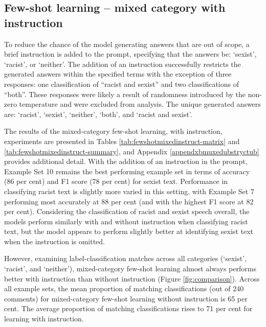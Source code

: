 \documentclass[12pt,]{article}
\begin{document}
\hypertarget{few-shot-learning-mixed-category-with-instruction}{%
\subsection{Few-shot learning -- mixed category with instruction}\label{few-shot-learning-mixed-category-with-instruction}}

To reduce the chance of the model generating answers that are out of scope, a brief instruction is added to the prompt, specifying that the answers be: `sexist', `racist', or `neither'. The addition of an instruction successfully restricts the generated answers within the specified terms with the exception of three responses: one classification of ``racist and sexist'' and two classifications of ``both''. These responses were likely a result of randomness introduced by the non-zero temperature and were excluded from analysis. The unique generated answers are: `racist', `sexist', `neither', `both', and `racist and sexist'.

The results of the mixed-category few-shot learning, with instruction, experiments are presented in Tables \ref{tab:fewshotmixedinstruct-matrix} and \ref{tab:fewshotmixedinstruct-summary}, and Appendix \ref{appendxbmuxedubstryctub} provides additional detail. With the addition of an instruction in the prompt, Example Set 10 remains the best performing example set in terms of accuracy (86 per cent) and F1 score (78 per cent) for sexist text. Performance in classifying racist text is slightly more varied in this setting, with Example Set 7 performing most accurately at 88 per cent (and with the highest F1 score at 82 per cent). Considering the classification of racist and sexist speech overall, the models perform similarly with and without instruction when classifying racist text, but the model appears to perform slightly better at identifying sexist text when the instruction is omitted.

However, examining label-classification matches across all categories (`sexist', `racist', and `neither'), mixed-category few-shot learning almost always performs better with instruction than without instruction (Figure \ref{fig:comparison}). Across all example sets, the mean proportion of matching classifications (out of 240 comments) for mixed-category few-shot learning without instruction is 65 per cent. The average proportion of matching classifications rises to 71 per cent for learning with instruction.
\end{document}
